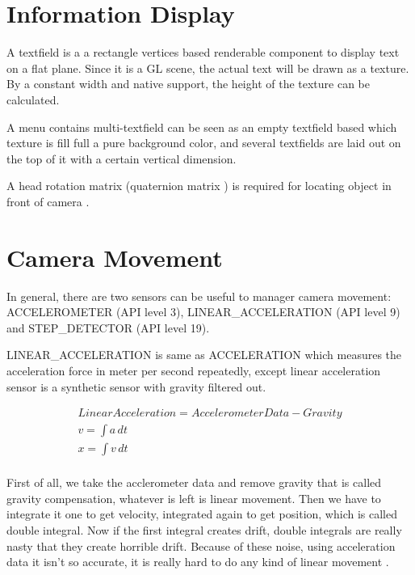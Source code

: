\section{Information Display}

A textfield is a a rectangle vertices based renderable component to display text on a flat plane. Since it is a GL scene, the actual text will be drawn as a texture. By a constant width and native  support, the height of the texture can be calculated. 

A menu contains multi-textfield can be seen as an empty textfield based which texture is fill full a pure background color, and several  textfields are laid out on the top of it with a certain vertical dimension.

A head rotation matrix (quaternion matrix \parencite{jvv.quaternions.2013}) is required for locating object in front of camera \parencite{mathworks.quaternion-rotation.2016}.

\section{Camera Movement}

In general, there are two sensors can be useful to manager camera movement: ACCELEROMETER (API level 3), LINEAR\_ACCELERATION (API level 9) and STEP\_DETECTOR (API level 19). 

LINEAR\_ACCELERATION is same as ACCELERATION which measures the acceleration force in meter per second repeatedly, except linear acceleration sensor is a synthetic sensor with gravity filtered out. 

\[
\begin{array}{lr}
Linear Acceleration = Accelerometer Data - Gravity\\
v = \int a\,dt\\
x = \int v\,dt\\
\end{array}
\]

First of all, we take the acclerometer data and remove gravity that is called gravity compensation, whatever is left is linear movement. Then we have to integrate it one to get velocity, integrated again to get position, which is called double integral. Now if the first integral creates drift, double integrals are really nasty that they create horrible drift. Because of these noise, using acceleration data it isn't so accurate, it is really hard to do any kind of linear movement \parencite{GoogleTechTalks.sensor-fusion.2010}.

